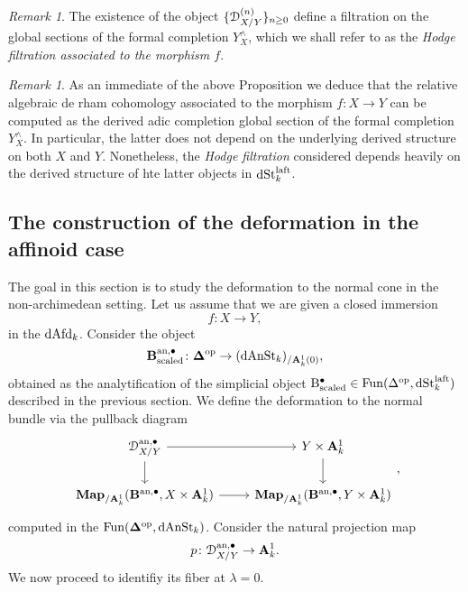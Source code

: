 \documentclass[10pt,a4paper,reqno]{amsart} %
\theoremstyle{plain}
\theoremstyle{definition}
\theoremstyle{remark}
\newtheorem{rem}[thm]{Remark}
\numberwithin{equation}{section}
\begin{document}
\begin{rem}
    The existence of the object $\{ \mathcal D^{(n)}_{X/ Y} \}_{n \ge 0}$ define a filtration on the global sections of the formal completion $Y^\wedge_X$, which we shall
    refer to as the \emph{Hodge filtration associated to the morphism $f$}.
\end{rem}

\begin{rem} 
As an immediate of the above Proposition we deduce that the relative algebraic de rham cohomology associated to the morphism $f \colon X \to Y$ can be computed
as the derived adic completion global section of the formal completion $Y^\wedge_X$. In particular, the latter does not depend on the underlying derived structure
on both $X$ and $Y$. Nonetheless, the \emph{Hodge filtration} considered depends heavily on the derived structure of hte latter objects in $\mathrm{dSt}^{\mathrm{laft}}_k$.
\end{rem}

\subsection{The construction of the deformation in the affinoid case} The goal in this section is to study the deformation to the normal cone in the non-archimedean
setting. Let us assume that we are given a closed immersion
    \[
        f \colon X \to Y,
    \]  
in the \infcat $\mathrm{dAfd}_k$. Consider the object
    \[
        \mathbf{B}^{\mathrm{an}, \bullet}_{\mathrm{scaled}} \colon \bm{\Delta} ^\mathrm{op} \to (\mathrm{dAnSt}_k)_{/ \mathbf A^1_k(0)},
    \]
obtained as the analytification of the simplicial object $\mathrm{B}^\bullet_{\mathrm{scaled}} \in \operatorname{Fun}(\Delta ^\mathrm{op}, \mathrm{dSt}^{\mathrm{laft}}_k)$ described in the previous section.
We define the deformation to the normal bundle via the pullback diagram
    \[
    \begin{tikzcd}
        \cD_{X/Y}^{\mathrm{an}, \bullet} \ar{r} \ar{d} & Y \times \bA^1_k \ar{d} \\
        \bfMap_{/ \bA^1_k}(\mathbf{B}^{\mathrm{an}, \bullet}, X \times \bA^1_k) \ar{r} & \bfMap_{/ \bA^1_k}(\mathbf{B}^{\mathrm{an, \bullet}}, Y \times \bA^1_k)
    \end{tikzcd},
    \]
computed in the \infcat $\mathrm{Fun}(\bm{\Delta} ^\mathrm{op}, \mathrm{dAnSt}_k)$.
Consider the natural projection map
    \[
        p \colon \mathcal D_{X/Y}^{\mathrm{an}, \bullet} \to \mathbf A^1_k. 
    \]
We now proceed to identifiy its fiber at $\lambda = 0$.
\end{document}
